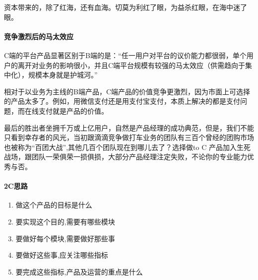 \documentclass[letterpaper,10pt,english]{sphinxmanual}
\begin{document}
资本带来的，除了红海，还有血海。切莫为利红了眼，为益杀红眼，在海中迷了眼。


\paragraph{竞争激烈后的马太效应}
\label{\detokenize{chapter_introduction/2C:id10}}
C端的平台产品显著区别于B端的是：“任一用户对平台的议价能力都很弱，单个用户的离开对业务的影响很小，并且C端平台规模有较强的马太效应（供需趋向于集中化），规模本身就是护城河。”%
\begin{footnote}[109]\sphinxAtStartFootnote
{}
%
\end{footnote}

相对于以业务为主线的B端产品，C端产品的价值竞争更激烈，因为市面上可选择的产品太多了。例如，用微信支付还是用支付宝支付，本质上解决的都是支付问题，而在线支付就是产品的价值。

最后的胜出者坐拥千万或上亿用户，自然是产品经理的成功典范，但是，我们不能只看到幸存者的风光，当初跟滴滴竞争做打车业务的团队有三百个曾经的团购市场也被称为“百团大战”,其他几百个团队现在到哪儿去了？选择做to
C
产品加入生死战场，跟团队一荣俱荣一损俱损，大部分产品经理注定失败，不论你的专业能力优秀与否。%
\begin{footnote}[110]\sphinxAtStartFootnote
{}
%
\end{footnote}


\paragraph{2C思路}
\label{\detokenize{chapter_introduction/2C:id11}}\begin{enumerate}
%
\item {} 
做这个产品的目标是什么

\item {} 
要实现这个目的,需要有哪些模块

\item {} 
要做好每个模块,需要做好那些事

\item {} 
要做好这些事,应关注哪些指标

\item {} 
要完成这些指标,产品及运营的重点是什么%
\begin{footnote}[111]\sphinxAtStartFootnote
{}
%
\end{footnote}

\end{enumerate}
\end{document}

